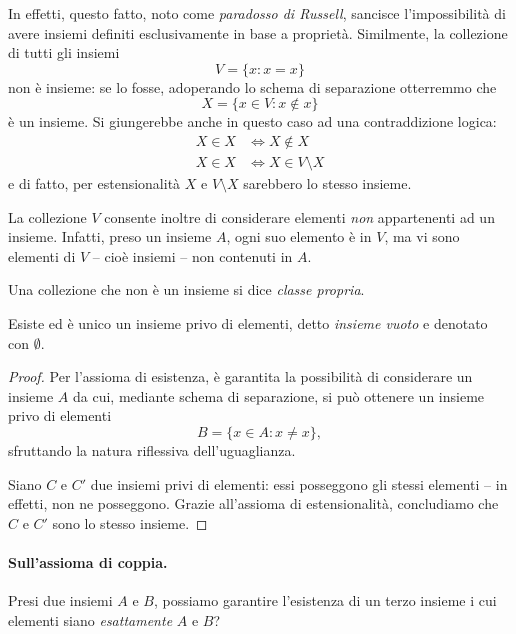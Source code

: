 In effetti, questo fatto, noto come \emph{paradosso di Russell}, sancisce l'impossibilità di avere insiemi definiti esclusivamente in base a proprietà. Similmente, la collezione di tutti gli insiemi
\begin{equation}
  V = \lbrace x \colon x = x \rbrace
\end{equation}
non è insieme: se lo fosse, adoperando lo schema di separazione otterremmo che
\begin{equation}
  X = \lbrace x \in V \colon x \notin x \rbrace
\end{equation}
è un insieme. Si giungerebbe anche in questo caso ad una contraddizione logica:
\begin{align*}
  X \in X &\iff X \notin X \\ X \in X &\iff X \in V \setminus X
\end{align*}
e di fatto, per estensionalità \(X\) e \(V \setminus X\) sarebbero lo stesso insieme.

La collezione \(V\) consente inoltre di considerare elementi \emph{non} appartenenti ad un insieme. Infatti, preso un insieme \(A\), ogni suo elemento è in \(V\), ma vi sono elementi di \(V\) -- cioè insiemi -- non contenuti in \(A\).

\begin{dfn}
  Una collezione che non è un insieme si dice \emph{classe propria}.
\end{dfn}

\begin{thm}
  Esiste ed è unico un insieme privo di elementi, detto \emph{insieme vuoto} e denotato con \(\emptyset{}\).
\end{thm}
\begin{proof}
  Per l'assioma di esistenza, è garantita la possibilità di considerare un insieme \(A\) da cui, mediante schema di separazione, si può ottenere un insieme privo di elementi
  \begin{equation}
    B = \lbrace x \in A \colon x \ne x \rbrace,
  \end{equation}
  sfruttando la natura riflessiva dell'uguaglianza.

  Siano \(C\) e \(C'\) due insiemi privi di elementi: essi posseggono gli stessi elementi -- in effetti, non ne posseggono. Grazie all'assioma di estensionalità, concludiamo che \(C\) e \(C'\) sono lo stesso insieme.
\end{proof}

\paragraph{Sull'assioma di coppia.} Presi due insiemi \(A\) e \(B\), possiamo garantire l'esistenza di un terzo insieme i cui elementi siano \emph{esattamente} \(A\) e \(B\)?

